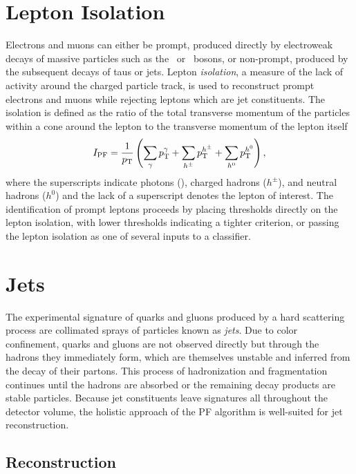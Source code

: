 \section{Lepton Isolation}

Electrons and muons can either be prompt, produced directly by electroweak decays of massive particles such as the \bosW\ or \bosZ\ bosons, or non-prompt, produced by the subsequent decays of taus or jets. Lepton \textit{isolation}, a measure of the lack of activity around the charged particle track, is used to reconstruct prompt electrons and muons while rejecting leptons which are jet constituents. The isolation is defined as the ratio of the total transverse momentum of the particles within a cone around the lepton to the transverse momentum of the lepton itself
\begin{equation}
  I_{\mathrm{PF}} = \frac{1}{\pT} \left( \sum_{\bosg}\pT^{\bosg} + \sum_{h^{\pm}}\pT^{h^{\pm}} + \sum_{h^{0}}\pT^{h^{0}} \right),
  \label{eq:iso}
\end{equation}
where the superscripts indicate photons (\bosg), charged hadrons ($h^{\pm}$), and neutral hadrons ($h^{0}$) and the lack of a superscript denotes the lepton of interest. The identification of prompt leptons proceeds by placing thresholds directly on the lepton isolation, with lower thresholds indicating a tighter criterion, or passing the lepton isolation as one of several inputs to a classifier.

\section{Jets}\label{jetreco}

The experimental signature of quarks and gluons produced by a hard scattering process are collimated sprays of particles known as \textit{jets}. Due to color confinement, quarks and gluons are not observed directly but through the hadrons they immediately form, which are themselves unstable and inferred from the decay of their partons. This process of hadronization and fragmentation continues until the hadrons are absorbed or the remaining decay products are stable particles. Because jet constituents leave signatures all throughout the detector volume, the holistic approach of the PF algorithm is well-suited for jet reconstruction.

\subsection{Reconstruction}

